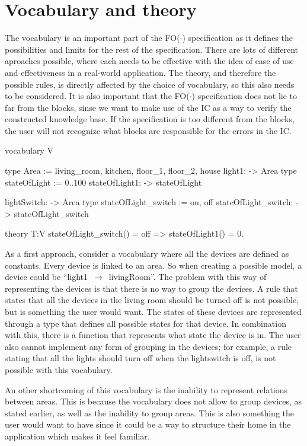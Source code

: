 \documentclass[11pt,a4paper]{report}
\newcommand{\fodot}{FO($\cdot$)\xspace}
\begin{document}
\section{Vocabulary and theory} 
The vocabulary is an important part of the \fodot specification as it defines the possibilities and limits for the rest of the specification. There are lots of different aproaches possible, where each needs to be effective with the idea of ease of use and effectiveness in a real-world application. The theory, and therefore the possible rules, is directly affected by the choice of vocabulary, so this also needs to be considered. It is also important that the \fodot specification does not lie to far from the blocks, sinse we want to make use of the IC as a way to verify the constructed knowledge base. If the specification is too different from the blocks, the user will not recognize what blocks are responsible for the errors in the IC.

\begin{idplisting}
vocabulary V {
    type Area := {living_room, kitchen, floor_1, floor_2, house}
    light1: -> Area
    type stateOfLight := {0..100}
    stateOfLight1: -> stateOfLight

    lightSwitch: -> Area
    type stateOfLight_switch := {on, off}
    stateOfLight_switch: -> stateOfLight_switch
}

theory T:V {
    stateOfLight_switch() = off => stateOfLight1() = 0.
}
\end{idplisting}

As a first approach, consider a vocabulary where all the devices are defined as constants. Every device is linked to an area. So when creating a possible model, a device could be ``light1~$\rightarrow$~livingRoom''. The problem with this way of representing the devices is that there is no way to group the devices. A rule that states that all the devices in the living room should be turned off is not possible, but is something the user would want. The states of these devices are represented through a type that defines all possible states for that device. In combination with this, there is a function that represents what state the device is in. The user also cannot implement any form of grouping in the devices; for example, a rule stating that all the lights should turn off when the lightswitch is off, is not possible with this vocabulary.

An other shortcoming of this vocabulary is the inability to represent relations between areas. This is because the vocabulary does not allow to group devices, as stated earlier, as well as the inability to group areas. This is also something the user would want to have since it could be a way to structure their home in the application which makes it feel familiar.
\end{document}
